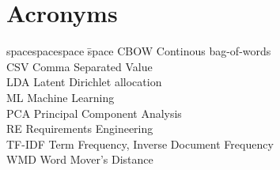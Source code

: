 \section*{Acronyms}

\begin{tabbing}
spacespacespace \= space \kill
CBOW \> Continous bag-of-words \\
CSV \> Comma Separated Value \\
LDA	\>	Latent Dirichlet allocation \\
ML \> Machine Learning\\
PCA \> Principal Component Analysis\\
RE	\>	Requirements Engineering \\
TF-IDF \> Term Frequency, Inverse Document Frequency \\
WMD \> Word Mover's Distance\\
\end{tabbing}
